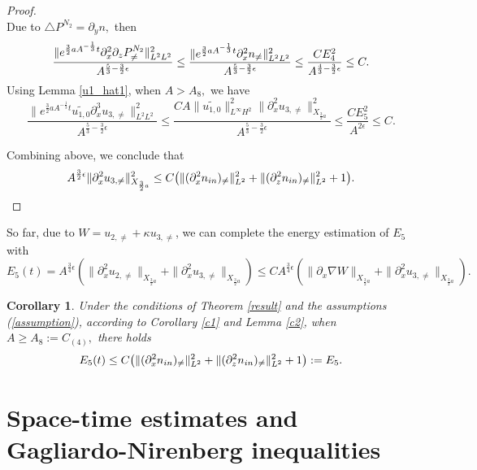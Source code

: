 \documentclass[12pt, reqno]{amsart}
\newtheorem{corollary}{Corollary}[section]
\numberwithin{equation}{section}
\begin{document}
\begin{proof}
\begin{equation*}
		\end{equation*}
		Due to  $\triangle P^{N_2}=\partial_yn,$  then 
		\begin{equation*}
			\frac{\|{\rm e}^{\frac32aA^{-\frac{1}{3}}t}
				\partial_x^2\partial_zP^{N_2}_{\neq}\|^2_{L^2L^2}}
			{A^{\frac{5}{3}-\frac32\epsilon}}\leq 
			\frac{\|{\rm e}^{\frac32aA^{-\frac{1}{3}}t}
				\partial_x^2 n_{\neq}\|^2_{L^2L^2}}
			{A^{\frac{5}{3}-\frac32\epsilon}}\leq 
			\frac{CE_4^2}
			{A^{\frac{4}{3}-\frac32\epsilon}}\leq C.
		\end{equation*}
		Using Lemma \ref{u1_hat1}, when $ A>A_{8}, $ we have
		\begin{equation*}
			\frac{\|e^{\frac32aA^{-\frac13}t}\widetilde{ u_{1,0}}\partial_{x}^{3}u_{3,\neq}\|_{L^{2}L^{2}}^{2}}{A^{\frac53-\frac32\epsilon}}\leq\frac{CA\|\widetilde{ u_{1,0}}\|_{L^{\infty}H^{2}}^{2}\|\partial_{x}^{2}u_{3,\neq}\|_{X_{\frac32a}}^{2}}{A^{\frac53-\frac32\epsilon}}\leq\frac{CE_{5}^{2}}{A^{2\epsilon}}\leq C.
		\end{equation*}
		
		
		Combining above, we conclude that 
		$$A^{\frac32\epsilon}\|\partial_x^2u_{3,\neq}\|^2_{X_{\frac32a}}\leq C\big(\|(\partial_x^2n_{\rm in})_{\neq}\|^2_{L^2}
		+\|(\partial_z^2n_{\rm in})_{\neq}\|^2_{L^2}+1\big).$$
	\end{proof}
	So far, due to $W=u_{2,\neq}+\kappa u_{3,\neq}$, we can complete the energy estimation of $E_5$ with 
	\begin{equation*}
		E_{5}(t)=A^{\frac{3}{4}\epsilon}\left(\|\partial^2_{x}u_{2,\neq}\|_{X_{\frac{3}{2}a}}+
		\|\partial_{x}^2u_{3,\neq}\|_{X_{\frac{3}{2}a}}\right)\leq C
		A^{\frac{3}{4}\epsilon}
		\left(\|\partial_x\nabla W\|_{X_{\frac{3}{2}a}}+
		\|\partial_{x}^2u_{3,\neq}\|_{X_{\frac{3}{2}a}}\right).
	\end{equation*}
	
	\begin{corollary}
		Under the conditions of Theorem \ref{result} and the assumptions (\ref{assumption}),
		according to Corollary \ref{c1} and Lemma \ref{c2}, when $A\geq A_8:=C_{(4)},$
		there holds
		\begin{equation}
			E_5(t)\leq  C\big(\|(\partial_x^2n_{\rm in})_{\neq}\|^2_{L^2}
			+\|(\partial_z^2n_{\rm in})_{\neq}\|^2_{L^2}+1\big):=E_5.
		\end{equation}
	\end{corollary}
	\appendix		
	
	
	
	\section{Space-time estimates and Gagliardo-Nirenberg inequalities}
	
\end{document}
